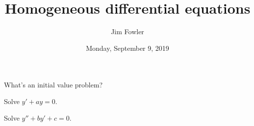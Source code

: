 \documentclass{homework}
\author{Jim Fowler}
\title{Homogeneous differential equations}
\date{Monday, September 9, 2019}
\begin{document}
\maketitle

\begin{problem}
  What's an initial value problem?
\end{problem}

\vfill

\begin{problem}
  Solve $y' + ay = 0$.
\end{problem}

\vfill

\begin{problem}
  Solve $y'' + by' + c = 0$.
\end{problem}

\vfill
\vfill





\end{document}
